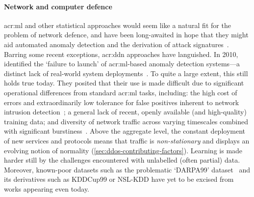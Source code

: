 \paragraph{Network and computer defence}
\gls{acr:ml} and other statistical approaches would seem like a natural fit for the problem of network defence, and have been long-awaited in hope that they might aid automated anomaly detection and the derivation of attack signatures~\parencite{DBLP:journals/comsur/BhuyanBK14}.
Barring some recent exceptions, \gls{acr:ddn} approaches have languished.
In 2010, \citeauthor{DBLP:conf/sp/SommerP10} identified the `failure to launch' of \gls{acr:ml}-based anomaly detection systems---a distinct lack of real-world system deployments~\parencite{DBLP:conf/sp/SommerP10}.
To quite a large extent, this still holds true today.
They posited that their use is made difficult due to significant operational differences from standard \gls{acr:ml} tasks, including: the high cost of errors and extraordinarily low tolerance for false positives inherent to network intrusion detection~\parencite{DBLP:conf/ccs/Axelsson99}; a general lack of recent, openly available (and high-quality) training data; and diversity of network traffic across varying timescales combined with significant burstiness~\parencite{DBLP:journals/ccr/LelandWTW95}.
Above the aggregate level, the constant deployment of new services and protocols means that traffic is \emph{non-stationary} and displays an evolving notion of normality (\cref{sec:ddos-contributing-factors}).
Learning is made harder still by the challenges encountered with unlabelled (often partial) data.
Moreover, known-poor datasets such as the problematic `DARPA99' dataset~\parencite{DARPA-IDD, DBLP:conf/cisda/TavallaeeBLG09, DBLP:conf/sp/SommerP10} and its derivatives such as KDDCup99 or NSL-KDD have yet to be excised from works appearing even today.

